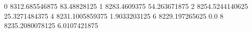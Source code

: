 0 8312.685546875 83.48828125
1 8283.4609375 54.263671875
2 8254.5244140625 25.3271484375
4 8231.1005859375 1.9033203125
6 8229.197265625 0.0
8 8235.2080078125 6.0107421875

